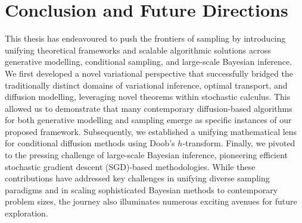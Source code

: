 
\chapter[Conclusion and Future Directions]{Conclusion and Future Directions}
\label{chapter:conclusion}

This thesis has endeavoured to push the frontiers of sampling by introducing unifying theoretical frameworks and scalable algorithmic solutions across generative modelling, conditional sampling, and large-scale Bayesian inference. We first developed a novel variational perspective that successfully bridged the traditionally distinct domains of variational inference, optimal transport, and diffusion modelling, leveraging novel theorems within stochastic calculus. This allowed us to demonstrate that many contemporary diffusion-based algorithms for both generative modelling and sampling emerge as specific instances of our proposed framework. Subsequently, we established a unifying mathematical lens for conditional diffusion methods using Doob's \(h\)-transform. Finally, we pivoted to the pressing challenge of large-scale Bayesian inference, pioneering efficient stochastic gradient descent (SGD)-based methodologies. While these contributions have addressed key challenges in unifying diverse sampling paradigms and in scaling sophisticated Bayesian methods to contemporary problem sizes, the journey also illuminates numerous exciting avenues for future exploration.

